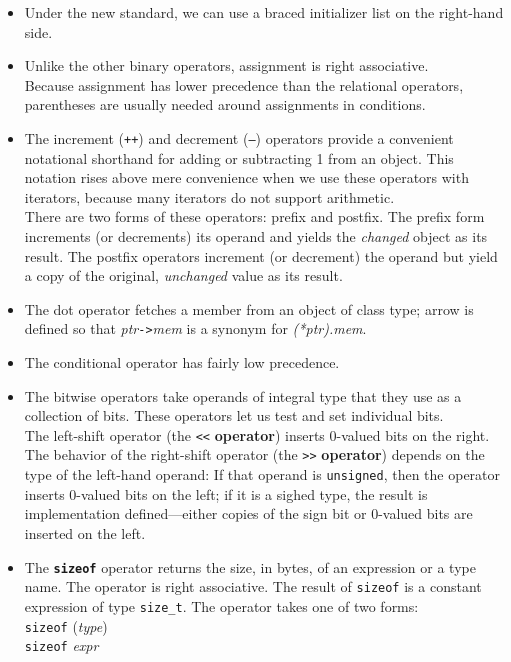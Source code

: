 \begin{itemize}
\item
Under the new standard, we can use a braced initializer list on the right-hand side.

\item
Unlike the other binary operators, assignment is right associative.\\
Because assignment has lower precedence than the relational operators, parentheses are usually needed around assignments in conditions.

\item
The increment (\texttt{++}) and decrement (\texttt{--}) operators provide a convenient notational shorthand for adding or subtracting 1 from an object. This notation rises above mere convenience when we use these operators with iterators, because many iterators do not support arithmetic.\\
There are two forms of these operators: prefix and postfix.  The prefix form increments (or decrements) its operand and yields the \textit{changed} object as its result. The postfix operators increment (or decrement) the operand but yield a copy of the original, \textit{unchanged} value as its result.

\item
The dot operator fetches a member from an object of class type; arrow is defined so that \textit{ptr}\texttt{->}\textit{mem} is a synonym for \textit{(*ptr).mem}.

\item
The conditional operator has fairly low precedence.

\item
The bitwise operators take operands of integral type that they use as a collection of bits. These operators let us test and set individual bits.\\
The left-shift operator (the \texttt{<<} \textbf{operator}) inserts 0-valued bits on the right. The behavior of the right-shift operator (the \texttt{>>} \textbf{operator}) depends on the type of the left-hand operand: If that operand is \texttt{unsigned}, then the operator inserts 0-valued bits on the left; if it is a sighed type, the result is implementation defined---either copies of the sign bit or 0-valued bits are inserted on the left.

\item
The \texttt{\textbf{sizeof}} operator returns the size, in bytes, of an expression or a type name. The operator is right associative. The result of \texttt{sizeof} is a constant expression of type \texttt{size\_t}. The operator takes one of two forms:\\
\hspace*{1em}\texttt{sizeof} (\textit{type})\\
\hspace*{1em}\texttt{sizeof} \textit{expr}


\end{itemize}
